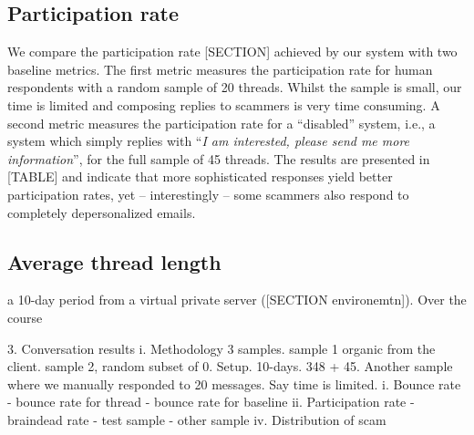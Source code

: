 \begin{center}
\end{center}

\subsection{Participation rate}
We compare the participation rate [SECTION] achieved by our system with two baseline metrics. The first metric measures the participation rate for human respondents with a random sample of 20 threads. Whilst the sample is small, our time is limited and composing replies to scammers is very time consuming. A second metric measures the participation rate for a ``disabled'' system, i.e., a system which simply replies with ``\textit{I am interested, please send me more information}'', for the full sample of 45 threads.  The results are presented in [TABLE] and indicate that more sophisticated responses yield better participation rates, yet -- interestingly -- some scammers also respond to completely depersonalized emails.

\begin{center}
\end{center}
 
\subsection{Average thread length}

a 10-day period from a virtual private server ([SECTION environemtn]). Over the course 

	3. Conversation results
		i. Methodology 3 samples. sample 1 organic from the client. sample 2, random subset of 
		0. Setup. 10-days. 348 + 45. Another sample where we manually responded to 20 messages. Say time is limited.
		i. Bounce rate
			- bounce rate for thread
			- bounce rate for baseline
		ii. Participation rate
			- braindead rate
			- test sample
			- other sample
		iv. Distribution of scam

